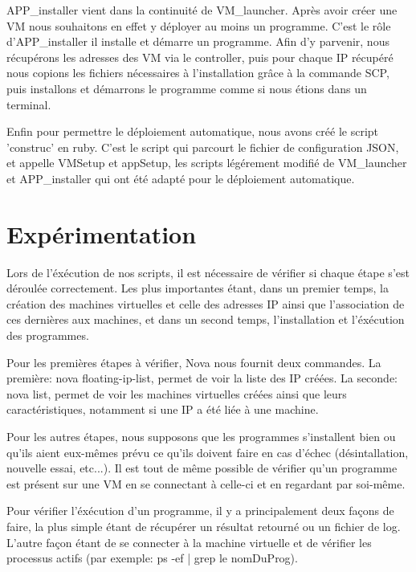 \documentclass{report}
\begin{document}
APP\_installer vient dans la continuité de VM\_launcher. Après avoir créer une VM nous souhaitons en effet y déployer au moins un programme. C'est le rôle d'APP\_installer il installe et démarre un programme. Afin d'y parvenir, nous récupérons les adresses des VM via le controller, puis pour chaque IP récupéré nous copions les fichiers nécessaires à l'installation grâce à la commande SCP, puis installons et démarrons le programme comme si nous étions dans un terminal.\bigbreak

Enfin pour permettre le déploiement automatique, nous avons créé le script 'construc' en ruby. C'est le script qui parcourt le fichier de configuration JSON, et appelle VMSetup et appSetup, les scripts légérement modifié de VM\_launcher et APP\_installer qui ont été adapté pour le déploiement automatique.\bigbreak

    \section{Expérimentation}
    
Lors de l'éxécution de nos scripts, il est nécessaire de vérifier si chaque étape s'est déroulée correctement. Les plus importantes étant, dans un premier temps, la création des machines virtuelles et celle des adresses IP ainsi que l'association de ces dernières aux machines, et dans un second temps, l'installation et l'éxécution des programmes.\bigbreak

Pour les premières étapes à vérifier, Nova nous fournit deux commandes. La première: nova floating-ip-list, permet de voir la liste des IP créées. La seconde: nova list, permet de voir les machines virtuelles créées ainsi que leurs caractéristiques, notamment si une IP a été liée à une machine.\bigbreak


Pour les autres étapes, nous supposons que les programmes s'installent bien ou qu'ils aient eux-mêmes prévu ce qu'ils doivent faire en cas d'échec (désintallation, nouvelle essai, etc...). Il est tout de même possible de vérifier qu'un programme est présent sur une VM en se connectant à celle-ci et en regardant par soi-même.\bigbreak

Pour vérifier l'éxécution d'un programme, il y a principalement  deux façons de faire, la plus simple étant de récupérer un résultat retourné ou un fichier de log. L'autre façon étant de se connecter à la machine virtuelle et de vérifier les processus actifs (par exemple: ps -ef | grep le nomDuProg).\bigbreak
\end{document}
